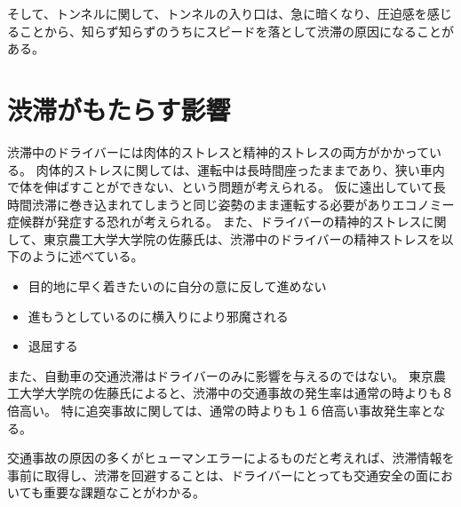 そして、トンネルに関して、トンネルの入り口は、急に暗くなり、圧迫感を感じることから、知らず知らずのうちにスピードを落として渋滞の原因になることがある\cite{zurich}。

\newpage


\section{渋滞がもたらす影響}
渋滞中のドライバーには肉体的ストレスと精神的ストレスの両方がかかっている。
肉体的ストレスに関しては、運転中は長時間座ったままであり、狭い車内で体を伸ばすことができない、という問題が考えられる。
仮に遠出していて長時間渋滞に巻き込まれてしまうと同じ姿勢のまま運転する必要がありエコノミー症候群が発症する恐れが考えられる。
また、ドライバーの精神的ストレスに関して、東京農工大学大学院の佐藤氏\cite{alma99344256104031}は、渋滞中のドライバーの精神ストレスを以下のように述べている。


\begin{itemize}
  \item 目的地に早く着きたいのに自分の意に反して進めない \\
  \item 進もうとしているのに横入りにより邪魔される \\
  \item 退屈する \\
\end{itemize}



また、自動車の交通渋滞はドライバーのみに影響を与えるのではない。
東京農工大学大学院の佐藤氏によると、渋滞中の交通事故の発生率は通常の時よりも８倍高い\cite{alma99344256104031}。
特に追突事故に関しては、通常の時よりも１６倍高い事故発生率となる。

交通事故の原因の多くがヒューマンエラーによるものだと考えれば、渋滞情報を事前に取得し、渋滞を回避することは、ドライバーにとっても交通安全の面においても重要な課題なことがわかる。

\newpage


